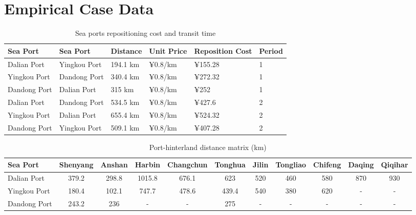 \documentclass[preprint,12pt]{elsarticle}
\begin{document}
\newpage
\section{Empirical Case Data}\label{app2}

\begin{table}[htbp]
\centering
\caption{Sea ports repositioning cost and transit time}
\label{tab:seaport_repositioning}
\small
\setlength{\tabcolsep}{4pt}
\begin{tabular}{llllll}
\hline
Sea Port & Sea Port & Distance & Unit Price & Reposition Cost & Period \\
\hline
Dalian Port & Yingkou Port & 194.1 km & ¥0.8/km & ¥155.28 & 1 \\
Yingkou Port & Dandong Port & 340.4 km & ¥0.8/km & ¥272.32 & 1 \\
Dandong Port & Dalian Port & 315 km & ¥0.8/km & ¥252 & 1 \\
Dalian Port & Dandong Port & 534.5 km & ¥0.8/km & ¥427.6 & 2 \\
Yingkou Port & Dalian Port & 655.4 km & ¥0.8/km & ¥524.32 & 2 \\
Dandong Port & Yingkou Port & 509.1 km & ¥0.8/km & ¥407.28 & 2 \\
\hline
\end{tabular}
\end{table}

\begin{table}
\centering
\caption{Port-hinterland distance matrix (km)}
\label{tab:port_hinterland_distance}
\small
\setlength{\tabcolsep}{4pt}
\begin{tabular}{l*{10}{c}}
\hline
Sea Port & Shenyang & Anshan & Harbin & Changchun & Tonghua & Jilin & Tongliao & Chifeng & Daqing & Qiqihar \\
\hline
Dalian Port & 379.2 & 298.8 & 1015.8 & 676.1 & 623 & 520 & 460 & 580 & 870 & 930 \\
Yingkou Port & 180.4 & 102.1 & 747.7 & 478.6 & 439.4 & 540 & 380 & 620 & - & - \\
Dandong Port & 243.2 & 236 & - & - & 275 & - & - & - & - & - \\
\hline
\end{tabular}
\end{table}
\end{document}
